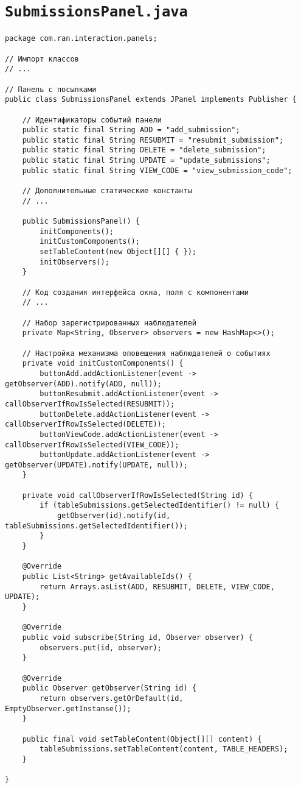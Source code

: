 \section*{\texttt{SubmissionsPanel.java}}
\begin{verbatim}
package com.ran.interaction.panels;

// Импорт классов
// ...

// Панель с посылками
public class SubmissionsPanel extends JPanel implements Publisher {

    // Идентификаторы событий панели
    public static final String ADD = "add_submission";
    public static final String RESUBMIT = "resubmit_submission";
    public static final String DELETE = "delete_submission";
    public static final String UPDATE = "update_submissions";
    public static final String VIEW_CODE = "view_submission_code";
    
    // Дополнительные статические константы
    // ...
    
    public SubmissionsPanel() {
        initComponents();
        initCustomComponents();
        setTableContent(new Object[][] { });
        initObservers();
    }

    // Код создания интерфейса окна, поля с компонентами 
    // ...                    

    // Набор зарегистрированных наблюдателей
    private Map<String, Observer> observers = new HashMap<>();
    
    // Настройка механизма оповещения наблюдателей о событиях
    private void initCustomComponents() {
        buttonAdd.addActionListener(event -> getObserver(ADD).notify(ADD, null));
        buttonResubmit.addActionListener(event -> callObserverIfRowIsSelected(RESUBMIT));
        buttonDelete.addActionListener(event -> callObserverIfRowIsSelected(DELETE));
        buttonViewCode.addActionListener(event -> callObserverIfRowIsSelected(VIEW_CODE));
        buttonUpdate.addActionListener(event -> getObserver(UPDATE).notify(UPDATE, null));
    }
    
    private void callObserverIfRowIsSelected(String id) {
        if (tableSubmissions.getSelectedIdentifier() != null) {
            getObserver(id).notify(id, tableSubmissions.getSelectedIdentifier());
        }
    }
    
    @Override
    public List<String> getAvailableIds() {
        return Arrays.asList(ADD, RESUBMIT, DELETE, VIEW_CODE, UPDATE);
    }
    
    @Override
    public void subscribe(String id, Observer observer) {
        observers.put(id, observer);
    }

    @Override
    public Observer getObserver(String id) {
        return observers.getOrDefault(id, EmptyObserver.getInstanse());
    }
    
    public final void setTableContent(Object[][] content) {
        tableSubmissions.setTableContent(content, TABLE_HEADERS);
    }
    
}
\end{verbatim}

